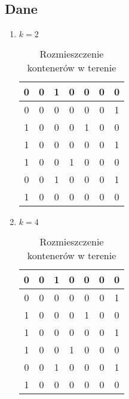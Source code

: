 \documentclass{article}
\begin{document}
\subsection{Dane}
\begin{enumerate}[label=(\alph*)]
    \item $k = 2$
        \begin{table}[H]
            \centering
            \begin{tabular}{|c|c|c|c|c|c|c|}
                \hline
                0 & 0 & 1 & 0 & 0 & 0 & 0 \\
                \hline
                0 & 0 & 0 & 0 & 0 & 0 & 1 \\
                \hline
                1 & 0 & 0 & 0 & 1 & 0 & 0 \\
                \hline
                1 & 0 & 0 & 0 & 0 & 0 & 1 \\
                \hline
                1 & 0 & 0 & 1 & 0 & 0 & 0 \\
                \hline
                0 & 0 & 1 & 0 & 0 & 0 & 1 \\
                \hline
                1 & 0 & 0 & 0 & 0 & 0 & 0 \\
                \hline
            \end{tabular}
            \caption{Rozmieszczenie kontenerów w terenie}
        \end{table}
        \textbf{ }
    \item $k = 4$
        \begin{table}[H]
            \centering
            \begin{tabular}{|c|c|c|c|c|c|c|}
                \hline
                0 & 0 & 1 & 0 & 0 & 0 & 0 \\
                \hline
                0 & 0 & 0 & 0 & 0 & 0 & 1 \\
                \hline
                1 & 0 & 0 & 0 & 1 & 0 & 0 \\
                \hline
                1 & 0 & 0 & 0 & 0 & 0 & 1 \\
                \hline
                1 & 0 & 0 & 1 & 0 & 0 & 0 \\
                \hline
                0 & 0 & 1 & 0 & 0 & 0 & 1 \\
                \hline
                1 & 0 & 0 & 0 & 0 & 0 & 0 \\
                \hline
            \end{tabular}
            \caption{Rozmieszczenie kontenerów w terenie}
        \end{table}
\end{enumerate}
\end{document}
